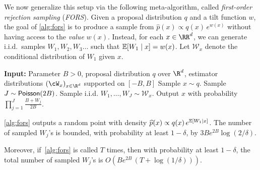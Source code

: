 We now generalize this setup via the following meta-algorithm, called \emph{first-order rejection sampling} (\emph{FORS}). Given a proposal distribution $q$ and a tilt function $w$, the goal of \cref{alg:fors} is to produce a sample from $\widehat p(x)\propto q(x)\, e^{w(x)}$ without having access to the \emph{value} $w(x)$. Instead, for each $x\in\RR^d$, we can generate i.i.d.\ samples $W_1,W_2, W_3\dotsc$ such that $\operatorname{\mathbb{E}}[W_1\mid x]=w(x)$. 
Let $\mathcal W_x$ denote the conditional distribution of $W_1$ given $x$.

\begin{algorithm}
\caption{First-order rejection sampling (FORS)}\label{alg:fors}
\begin{algorithmic}
\STATE \textbf{Input:} Parameter $B > 0$, proposal distribution $q$ over $\R^d$, estimator distributions $(\cW_x)_{x\in\R^d}$ supported on $[-B,B]$
\STATE Sample $x\sim q$.
\STATE Sample $J\sim \mathsf{Poisson}(2B)$.
\STATE Sample i.i.d. $W_1,\dotsc,W_J \sim \mathcal W_x$.
\STATE Output $x$ with probability $\prod_{j=1}^J \frac{B+W_j}{2B}$.
\ENDFOR
\end{algorithmic}
\end{algorithm}


\begin{theorem}\label{thm:fors}
    \cref{alg:fors} outputs a random point with density $\widehat p(x)\propto q(x)\, e^{\operatorname{\mathbb{E}}[W_1\mid x]}$.
    The number of sampled $W_j$'s is bounded, with probability at least $1-\delta$, by $3Be^{2B}\log(2/\delta)$.

    Moreover, if~\cref{alg:fors} is called $T$ times, then with probability at least $1-\delta$, the total number of sampled $W_j$'s is $O(Be^{2B}\,(T+\log(1/\delta)))$.
\end{theorem}
